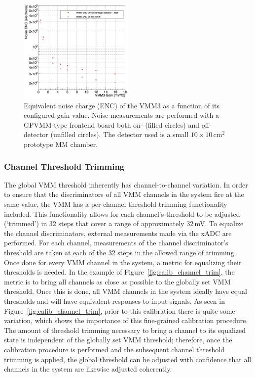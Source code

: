 \begin{figure}[!htb]
    \begin{center}
        \includegraphics[width=0.5\textwidth]{figures/nsw/calibration/vmm_noise_enc}
        \caption{
            Equivalent noise charge (ENC) of the VMM3 as a function of its configured gain value.
            Noise measurements are performed with a GPVMM-type frontend board both on- (filled circles)
            and off-detector (unfilled circles).
            The detector used is a small $10\times10$\,cm$^2$ prototype MM chamber.
        }
        \label{fig:vmm_noise_enc}
    \end{center}
\end{figure}

\subsubsection{Channel Threshold Trimming}
\label{sec:calib_trimming}

The global VMM threshold inherently has channel-to-channel variation.
In order to ensure that the discriminators of all VMM channels in the system
fire at the same value, the VMM has a per-channel threshold trimming functionality included.
This functionality allows for each channel's threshold to be adjusted (`trimmed') in 32 steps that cover a range
of approximately 32\,mV.
To equalize the channel discriminators, external measurements made via the xADC are performed.
For each channel, measurements of the channel discriminator's threshold are taken at each of the 32
steps in the allowed range of trimming.
Once done for every VMM channel in the system, a metric for equalizing their thresholds is needed.
In the example of Figure~\ref{fig:calib_channel_trim}, the metric is to bring all channels
as close as possible to the globally set VMM threshold.
Once this is done, all VMM channels in the system ideally have equal thresholds and will
have equivalent responses to input signals.
As seen in Figure~\ref{fig:calib_channel_trim}, prior to this calibration there is quite
some variation, which shows the importance of this fine-grained calibration procedure.
The amount of threshold trimming necessary to bring a channel to its equalized state
is independent of the globally set VMM threshold; therefore, once the calibration procedure
is performed and the subsequent channel threshold trimming is applied, the global
threshold can be adjusted with confidence that all channels in the system are likewise adjusted coherently.

